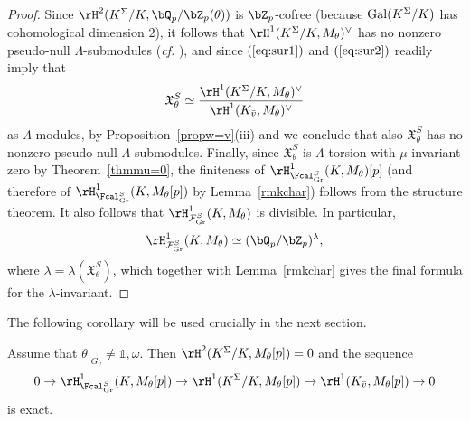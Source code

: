 \begin{proof}
Since $\rH^{2}(K^{\Sigma}/K,\bQ_p/\bZ_p(\theta))$ is $\bZ_p$-cofree (because ${\rm Gal}(K^\Sigma/K)$ has cohomological dimension $2$), it follows that $\rH^{1}(K^{\Sigma}/K,M_\theta)^\vee$ has no nonzero pseudo-null $\Lambda$-submodules (\emph{cf.} \cite[Prop.~5]{greenberg-iwasawa}), and since $(\ref{eq:sur1})$ and $(\ref{eq:sur2})$ readily imply that
\[
\mathfrak{X}_\theta^{S}\simeq\frac{\rH^1(K^\Sigma/K,M_\theta)^\vee}{\rH^1(K_{\bar{v}},M_\theta)^\vee}
\]
as $\Lambda$-modules, by Proposition~\ref{propw=v}(iii) and \cite[Lem.~2.6]{greenvats} we conclude that also $\mathfrak{X}_\theta^S$ has no nonzero pseudo-null $\Lambda$-submodules. Finally, since $\mathfrak{X}_\theta^S$ is $\Lambda$-torsion with $\mu$-invariant zero by Theorem~\ref{thmmu=0}, the finiteness of $\rH^{1}_{\Fcal^{S}_{\rm Gr}}(K,M_\theta)[p]$ (and therefore of $\rH^{1}_{\Fcal^{S}_{\rm Gr}}(K,M_\theta[p])$ by Lemma~\ref{rmkchar}) follows from the structure theorem. It also follows that
$\rH^1_{\mathcal{F}_{\rm Gr}^S}(K,M_\theta)$ is divisible. In particular,
\[
\rH^1_{\mathcal{F}_{\rm Gr}^S}(K,M_\theta)\simeq(\bQ_p/\bZ_p)^{\lambda},%
\]
where $\lambda=\lambda(\mathfrak{X}_\theta^S)$, which together with Lemma~\ref{rmkchar} gives the final formula for the $\lambda$-invariant.
\end{proof}

The following corollary will be used crucially in the next section.

\begin{cor}
\notready\label{corcharacters}
Assume that $\theta\vert_{G_{\bar{v}}}\neq\mathds{1},\omega$. Then
$\rH^{2}(K^{\Sigma}/K,M_\theta[p])=0$ and the sequence
\[
0\rightarrow\rH^1_{\Fcal_{\rm Gr}^S}(K,M_\theta[p])\rightarrow\rH^1(K^\Sigma/K,M_\theta[p])\rightarrow\rH^1(K_{\bar{v}},M_\theta[p])\rightarrow 0
\]
is exact.
\end{cor}


